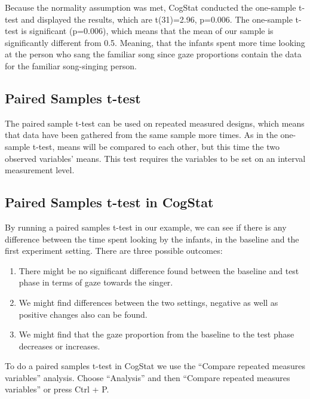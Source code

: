 \documentclass[
]{book}
\begin{document}
Because the normality assumption was met, CogStat conducted the one-sample t-test and displayed the results, which are t(31)=2.96, p=0.006. The one-sample t-test is significant (p=0.006), which means that the mean of our sample is significantly different from 0.5. Meaning, that the infants spent more time looking at the person who sang the familiar song since gaze proportions contain the data for the familiar song-singing person.

\hypertarget{paired-samples-t-test-1}{%
\subsection{Paired Samples t-test}\label{paired-samples-t-test-1}}

The paired sample t-test can be used on repeated measured designs, which means that data have been gathered from the same sample more times. As in the one-sample t-test, means will be compared to each other, but this time the two observed variables' means. This test requires the variables to be set on an interval measurement level.

\hypertarget{paired-samples-t-test-in-cogstat}{%
\subsection{Paired Samples t-test in CogStat}\label{paired-samples-t-test-in-cogstat}}

By running a paired samples t-test in our example, we can see if there is any difference between the time spent looking by the infants, in the baseline and the first experiment setting. There are three possible outcomes:

\begin{enumerate}
\def\labelenumi{\arabic{enumi}.}
\item
  There might be no significant difference found between the baseline and test phase in terms of gaze towards the singer.
\item
  We might find differences between the two settings, negative as well as positive changes also can be found.
\item
  We might find that the gaze proportion from the baseline to the test phase decreases or increases.
\end{enumerate}

To do a paired samples t-test in CogStat we use the ``Compare repeated measures variables'' analysis. Choose ``Analysis'' and then ``Compare repeated measures variables'' or press Ctrl + P.
\end{document}
